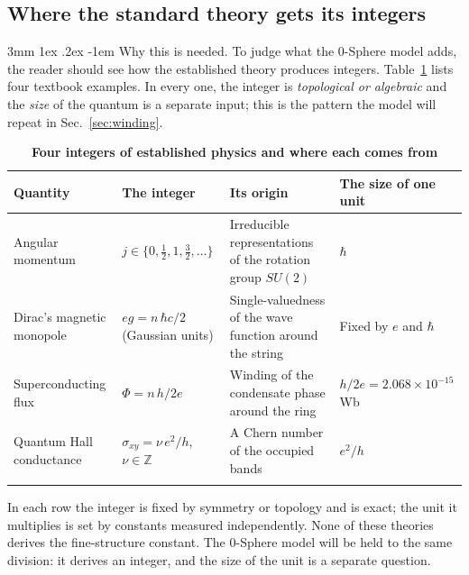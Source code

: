 \documentclass[%
 reprint, amsmath,amssymb, aps, prb, ]{revtex4-2}
\makeatletter
\numberwithin{equation}{section}
\renewcommand\paragraph{%
  \@startsection{paragraph}{4}{\z@}%
    {3mm \@plus 1ex \@minus .2ex}%
    {-1em}%
    {\normalfont\normalsize\itshape}}
\makeatother
\begin{document}
\subsection{Where the standard theory gets its integers}

\paragraph{Why this is needed.} To judge what the 0-Sphere model adds, the reader should see how the established theory produces integers. Table~\ref{tab:stdints} lists four textbook examples. In every one, the integer is \emph{topological or algebraic} and the \emph{size} of the quantum is a separate input; this is the pattern the model will repeat in Sec.~\ref{sec:winding}.

\begin{table}[t!]
\centering
\caption{\textbf{Four integers of established physics and where each comes from}}
\label{tab:stdints}
\renewcommand{\arraystretch}{1.4}
\begin{tabular}{p{3.4cm}p{4.2cm}p{4.2cm}p{3.8cm}}
\toprule
\textbf{Quantity} & \textbf{The integer} & \textbf{Its origin} & \textbf{The size of one unit} \\
\midrule
Angular momentum
& $j\in\{0,\tfrac12,1,\tfrac32,\dots\}$
& Irreducible representations of the rotation group $SU(2)$~\cite{ref:sakurai}
& $\hbar$ \\
\addlinespace[0.3cm]
Dirac's magnetic monopole
& $eg=n\,\hbar c/2$ (Gaussian units)
& Single-valuedness of the wave function around the string~\cite{ref:dirac31}
& Fixed by $e$ and $\hbar$ \\
\addlinespace[0.3cm]
Superconducting flux
& $\Phi=n\,h/2e$
& Winding of the condensate phase around the ring~\cite{ref:london,ref:deaver,ref:doll}
& $h/2e=2.068\times10^{-15}$ Wb \\
\addlinespace[0.3cm]
Quantum Hall conductance
& $\sigma_{xy}=\nu\,e^2/h$, $\nu\in\mathbb{Z}$
& A Chern number of the occupied bands~\cite{ref:klitzing,ref:tknn}
& $e^2/h$ \\
\addlinespace[0.2cm]
\bottomrule
\end{tabular}
\vspace{0.2cm}
\begin{minipage}{0.95\textwidth}
\justifying\footnotesize
In each row the integer is fixed by symmetry or topology and is exact; the unit it multiplies is set by constants measured independently. None of these theories derives the fine-structure constant. The 0-Sphere model will be held to the same division: it derives an integer, and the size of the unit is a separate question.
\end{minipage}
\end{table}
\end{document}
